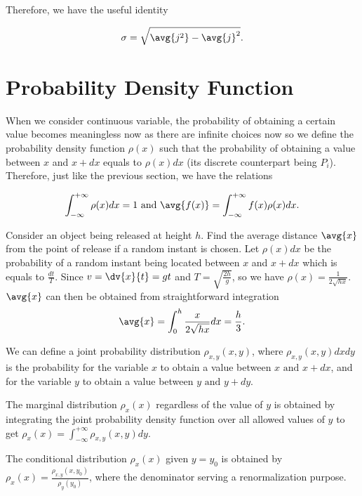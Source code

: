 \documentclass[english,a4paper,12pt]{report}
\begin{document}
Therefore, we have the useful identity

\begin{equation} 
	\sigma = \sqrt{\avg{ j^2 } - \avg{ j }^2}. 
\end{equation}
	
\section{Probability Density Function}
	
When we consider continuous variable, the probability of obtaining a certain value becomes meaningless now as there are infinite choices now so we define the probability density function \(\rho(x)\) such that the probability of obtaining a value between \(x\) and \(x + dx\) equals to \(\rho(x)dx\) (its discrete counterpart being \(P_{i}\)). Therefore, just like the previous section, we have the relations
	
\begin{equation} 
	\int_{-\infty}^{+\infty} \rho(x)dx = 1 \text { and } 	\avg{ f(x) } = \int_{-\infty}^{+\infty} f(x)\rho(x) dx .
\end{equation}

	
{Consider an object being released at height \(h\). Find the average distance \(\avg{x}\) from the point of release if a random instant is chosen.}
{Let \(\rho(x)dx\) be the probability of a random instant being located between \(x\) and \(x + dx\) which is equals to \(\frac{dt}{T}\). Since \(v = \dv{x}{t} = gt\) and \(T = \sqrt{\frac{2h}{g}}\), so we have \(\rho(x) = \frac{1}{2\sqrt{hx}}\).\(\avg{x}\) can then be obtained from straightforward integration 
\begin{equation} 
	\avg{x} = \int_{0}^{h} \frac{x}{2\sqrt{hx}} dx = \frac{h}{3}.
\end{equation}}

We can define a joint probability distribution \(\rho _{x,y}(x,y) \), where \(\rho _{x,y}(x,y)dxdy \) is the probability for the variable \(x\) to obtain a value between \(x \text { and } x+dx\), and for the variable \(y\) to obtain a value between \(y \text { and } y+dy\). 

The marginal distribution \(\rho _{x}(x) \) regardless of the value of \(y\) is obtained by integrating the joint probability density function over all allowed values of \(y\) to get \(\rho _{x}(x) = \int_{-\infty}^{+\infty}  \rho _{x,y}(x,y)dy\).

The conditional distribution \(\rho _{x} (x)\) given \(y = y_0 \) is obtained by \(\rho _{x} (x) = \frac{\rho _{x,y} (x,y_0 )}{\rho _{y}(y_0 ) } \), where the denominator serving a renormalization purpose.
\end{document}

